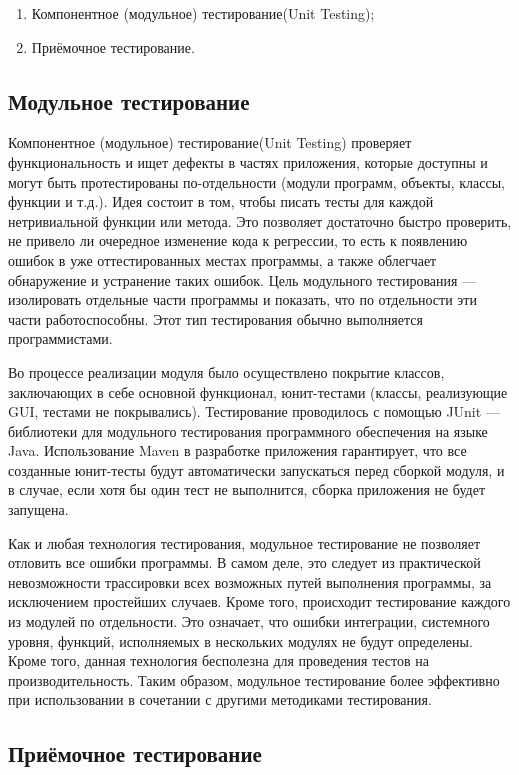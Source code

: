 \begin{enumerate}
\item Компонентное (модульное) тестирование(Unit Testing);
\item Приёмочное тестирование.
\end{enumerate}

\subsection{Модульное тестирование}

Компонентное (модульное) тестирование(Unit Testing) проверяет функциональность и ищет дефекты в частях
приложения, которые доступны и могут быть протестированы по-отдельности (модули программ, объекты, классы, функции
и т.д.)\cite{bek}. Идея состоит в том, чтобы писать тесты для каждой нетривиальной функции или метода. Это позволяет достаточно
быстро проверить, не привело ли очередное изменение кода к регрессии, то есть к появлению ошибок в уже оттестированных
местах программы, а также облегчает обнаружение и устранение таких ошибок. Цель модульного тестирования --- изолировать
отдельные части программы и показать, что по отдельности эти части работоспособны. Этот тип тестирования обычно
выполняется программистами\cite{stress}.

Во процессе реализации модуля было осуществлено покрытие классов, заключающих в себе основной функционал, юнит-тестами
(классы, реализующие GUI, тестами не покрывались). Тестирование проводилось с помощью JUnit ---  библиотеки для
модульного тестирования программного обеспечения на языке Java. Использование Maven в разработке приложения гарантирует,
что все созданные юнит-тесты будут автоматически запускаться перед сборкой модуля, и в случае, если хотя бы один тест не
выполнится, сборка приложения не будет запущена.

Как и любая технология тестирования, модульное тестирование не позволяет отловить все ошибки программы. В самом деле,
это следует из практической невозможности трассировки всех возможных путей выполнения программы, за исключением
простейших случаев. Кроме того, происходит тестирование каждого из модулей по отдельности. Это означает, что ошибки
интеграции, системного уровня, функций, исполняемых в нескольких модулях не будут определены. Кроме того, данная
технология бесполезна для проведения тестов на производительность. Таким образом, модульное тестирование более
эффективно при использовании в сочетании с другими методиками тестирования.

\subsection{Приёмочное тестирование}

